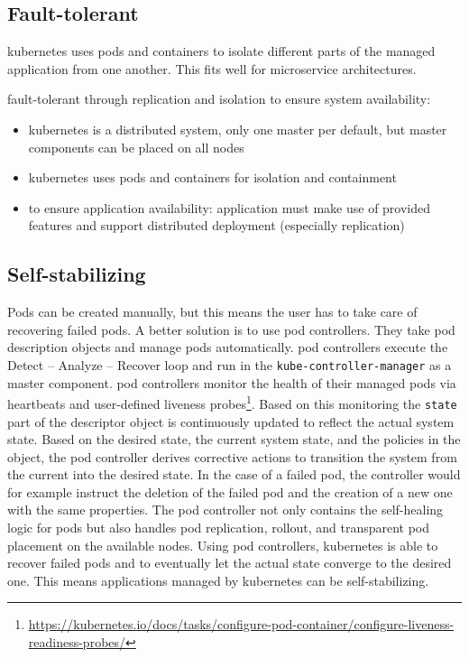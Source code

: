 \subsection{Fault-tolerant}\label{sec:self-healing-kubernetes:fault-tolerant}
  \Gls{kubernetes} uses pods and containers to isolate different parts of the managed application from one another.
  This fits well for microservice architectures.

  fault-tolerant through replication and isolation to ensure system availability:
  \begin{itemize}
    \item \gls{kubernetes} is a distributed system, only one master per default, but master components can be placed on all nodes
    \item \gls{kubernetes} uses pods and containers for isolation and containment
    \item to ensure application availability: application must make use of provided features and support distributed deployment (especially replication)
  \end{itemize}

\subsection{Self-stabilizing}\label{sec:self-healing-kubernetes:self-stabilizing}
  Pods can be created manually, but this means the user has to take care of recovering failed pods.
  A better solution is to use \glspl{pod controller}.
  They take pod description objects and manage pods automatically.
  \Glspl{pod controller} execute the Detect -- Analyze -- Recover loop and run in the \texttt{kube-controller-manager} as a master component.
  \Glspl{pod controller} monitor the health of their managed pods via heartbeats and user-defined liveness probes\footnote{\url{https://kubernetes.io/docs/tasks/configure-pod-container/configure-liveness-readiness-probes/}}.
  Based on this monitoring the \texttt{state} part of the descriptor object is continuously updated to reflect the actual system state.
  Based on the desired state, the current system state, and the policies in the object, the \gls{pod controller} derives corrective actions to transition the system from the current into the desired state.
  In the case of a failed pod, the controller would for example instruct the deletion of the failed pod and the creation of a new one with the same properties.
  The \gls{pod controller} not only contains the self-healing logic for pods but also handles pod replication, rollout, and transparent pod placement on the available nodes.
  Using \glspl{pod controller}, \gls{kubernetes} is able to recover failed pods and to eventually let the actual state converge to the desired one.
  This means applications managed by \gls{kubernetes} can be self-stabilizing.

